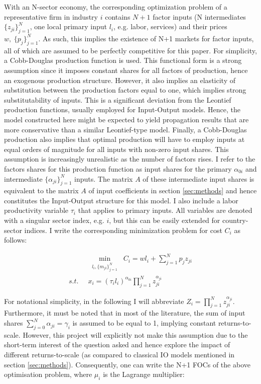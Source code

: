 With an N-sector economy, the corresponding optimization problem of a representative firm in industry $i$ contains $N+1$ factor inputs 
(N intermediates $\{z_{ji}\}_{j=1}^N $, one local primary input $l_i$, e.g. labor, services) and their prices 
$w, \hspace{3pt}\{p_{j}\}_{j=1}^N$. As such, this implies the existence of N+1 markets for factor inputs, all of which are assumed to 
be perfectly competitive for this paper. For simplicity, a Cobb-Douglas production function is used. This functional form is a strong 
assumption since it imposes constant shares for all factors of production, hence an exogenous production structure. However, it also 
implies an elasticity of substitution between the production factors equal to one, which implies strong substitutability of inputs. 
This is a significant deviation from the Leontief production functions, usually employed for Input-Output models. Hence, the model 
constructed here might be expected to yield propagation results that are more conservative than a similar Leontief-type model.
Finally, a Cobb-Douglas production also implies that optimal production will have to employ inputs at equal orders of magnitude for 
all inputs with non-zero input shares. This assumption is increasingly unrealistic as the number of factors rises. I refer to the 
factors shares for this production function as input shares for the primary $\alpha_{0i}$  and intermediate $\{\alpha_{ji}\}_{j=1}^N$ 
inputs. The matrix $A$ of these intermediate input shares is equivalent to the matrix $A$ of input coefficients in section 
\ref{sec:methods} and hence constitutes the Input-Output structure for this model. I also include a labor productivity variable 
$\tau_i$ that applies to primary inputs. All variables are denoted with a singular sector index, e.g. $i$, but this can be 
easily extended for country-sector indices. I write the corresponding minimization problem for cost $C_i$ as follows:

\begin{equation} \label{eq:min_prob}
\begin{split}
    &\min_{\substack{l_i, \{m_{ji}\}_{j=1}^N}} \mspace{5mu} C_i = wl_i + \sum_{j=1}^N p_j z_{ji} \\
   s.t. \mspace{10mu} &x_i = (\tau_i l_i)^{\alpha_{0i}} \prod_{j=1}^N z_{ji}^{\alpha_{ji}}
\end{split}
\end{equation}

For notational simplicity, in the following I will abbreviate $Z_i = \prod_{j=1}^N z_{ji}^{\alpha_{ji}}$. Furthermore, it must be noted
that in most of the literature, the sum of input shares $\sum_{j=0}^N \alpha_{ji} = \gamma_i$ is assumed to be equal to 1, implying 
constant returns-to-scale. However, this project will explicitly not make this assumption due to the short-term interest of the 
question asked and hence explore the impact of different returns-to-scale (as compared to classical IO models mentioned in section 
\ref{sec:methods}). Consequently, one can write the N+1 FOCs of the above optimisation problem, where $\mu_i$ is the Lagrange multiplier:

